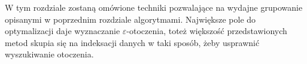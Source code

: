 W tym rozdziale zostaną omówione techniki pozwalające na wydajne grupowanie opisanymi w poprzednim rozdziale algorytmami. Największe pole do optymalizacji daje wyznaczanie $ \varepsilon $-otoczenia, toteż większość przedstawionych metod skupia się na indeksacji danych w taki sposób, żeby usprawnić wyszukiwanie otoczenia.